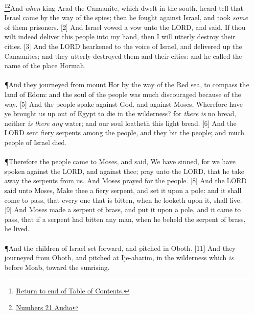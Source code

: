 \footnote{\textcolor[rgb]{0.00,0.25,0.00}{\hyperlink{NumbersTOC}{Return to end of Table of Contents.}}}\footnote{\href{https://audiobible.com/bible/numbers_21.html}{\textcolor[cmyk]{0.99998,1,0,0}{Numbers 21 Audio}}}\textcolor[cmyk]{0.99998,1,0,0}{And \emph{when} king Arad the Canaanite, which dwelt in the south, heard tell that Israel came by the way of the spies; then he fought against Israel, and took \emph{some} of them prisoners.}
[2] \textcolor[cmyk]{0.99998,1,0,0}{And Israel vowed a vow unto the LORD, and said, If thou wilt indeed deliver this people into my hand, then I will utterly destroy their cities.}
[3] \textcolor[cmyk]{0.99998,1,0,0}{And the LORD hearkened to the voice of Israel, and delivered up the Canaanites; and they utterly destroyed them and their cities: and he called the name of the place Hormah.}\\
\\
\P \textcolor[cmyk]{0.99998,1,0,0}{And they journeyed from mount Hor by the way of the Red sea, to compass the land of Edom: and the soul of the people was much discouraged because of the way.}
[5] \textcolor[cmyk]{0.99998,1,0,0}{And the people spake against God, and against Moses, Wherefore have ye brought us up out of Egypt to die in the wilderness? for \emph{there} \emph{is} no bread, neither \emph{is} \emph{there} \emph{any} water; and our soul loatheth this light bread.}
[6] \textcolor[cmyk]{0.99998,1,0,0}{And the LORD sent fiery serpents among the people, and they bit the people; and much people of Israel died.}\\
\\
\P \textcolor[cmyk]{0.99998,1,0,0}{Therefore the people came to Moses, and said, We have sinned, for we have spoken against the LORD, and against thee; pray unto the LORD, that he take away the serpents from us. And Moses prayed for the people.}
[8] \textcolor[cmyk]{0.99998,1,0,0}{And the LORD said unto Moses, Make thee a fiery serpent, and set it upon a pole: and it shall come to pass, that every one that is bitten, when he looketh upon it, shall live.}
[9] \textcolor[cmyk]{0.99998,1,0,0}{And Moses made a serpent of brass, and put it upon a pole, and it came to pass, that if a serpent had bitten any man, when he beheld the serpent of brass, he lived.}\\
\\
\P \textcolor[cmyk]{0.99998,1,0,0}{And the children of Israel set forward, and pitched in Oboth.}
[11] \textcolor[cmyk]{0.99998,1,0,0}{And they journeyed from Oboth, and pitched at Ije-abarim, in the wilderness which \emph{is} before Moab, toward the sunrising.}
